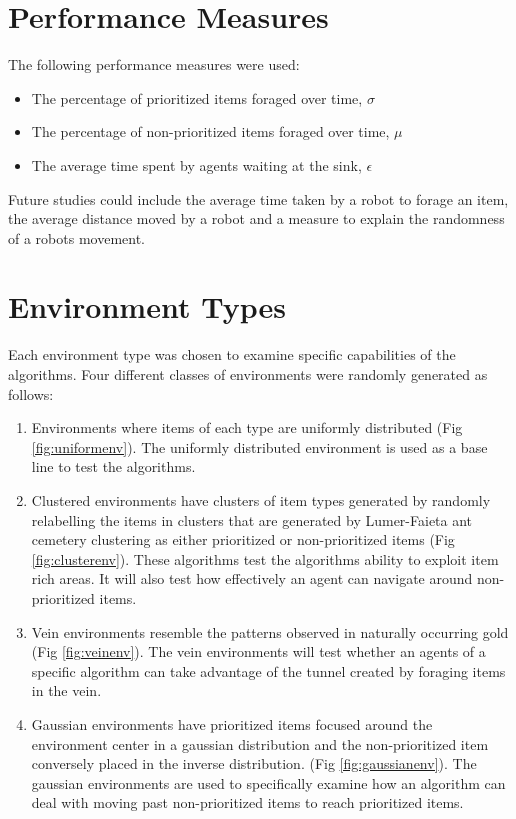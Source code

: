 \section{Performance Measures}
\label{thri:third:performancemeasures}

The following performance measures were used: 

	\begin{itemize}
		\item	The percentage of prioritized items foraged over time,  $\sigma$ 
		\item	The percentage of non-prioritized items foraged over time, $\mu$
		\item   The average time spent by agents waiting at the sink, $\epsilon$
	\end{itemize}
	
Future studies could include the average time taken by a robot to forage an item, the average distance moved by a robot and a measure to explain the randomness of a robots movement. 

\section{Environment Types}
\label{thri:third:environmenttypes}
Each environment type was chosen to examine specific capabilities of the algorithms. Four different classes of environments were randomly generated as follows:
\begin{enumerate}
\item Environments where items of each type are uniformly distributed (Fig \ref{fig:uniformenv}). The uniformly distributed environment is used as a base line to test the algorithms.
\item Clustered environments have clusters of item types generated by randomly relabelling the items in clusters that are generated by Lumer-Faieta ant cemetery clustering \cite{lumer1994diversity} as either prioritized or non-prioritized items (Fig \ref{fig:clusterenv}). These algorithms test the algorithms ability to exploit item rich areas. It will also test how effectively an agent can navigate around non-prioritized items. 
\item Vein environments resemble the patterns observed in naturally occurring gold \cite{frimmel2002recent} (Fig \ref{fig:veinenv}). The vein environments will test whether an agents of a specific algorithm can take advantage of the tunnel created by foraging items in the vein. 
\item Gaussian environments have prioritized items focused around the environment center in a gaussian distribution and the non-prioritized item conversely placed in the inverse distribution. (Fig \ref{fig:gaussianenv}). The gaussian environments are used to specifically examine how an algorithm can deal with moving past non-prioritized items to reach prioritized items. 
\end{enumerate} 


